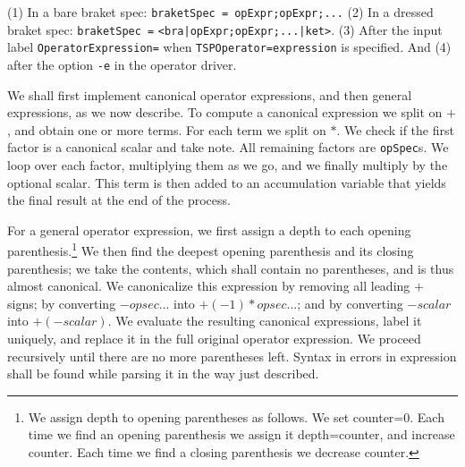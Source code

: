 \documentclass{article}
\begin{document}
(1) In a bare braket spec:
 \texttt{braketSpec = opExpr;opExpr;...}
(2) In a dressed braket spec:
 \texttt{braketSpec =} \texttt{<bra|opExpr;opExpr;...|ket>}.
(3) After the input label \texttt{OperatorExpression=} when
 \texttt{TSPOperator=expression} is specified.
And (4) after the option \verb!-e! in the operator driver.

We shall first implement canonical operator expressions, and then general expressions,
as we now describe.
To compute a canonical expression we split on $+$, and obtain one or more terms.
For each term we split on $*$. We check if the first factor is a 
canonical scalar and take note. All remaining factors are \texttt{opSpec}s.
We loop over each factor, multiplying them as we go, and
we finally multiply by the optional scalar. This term is then added to an
accumulation variable that yields the final result at the end of the process.

For a general operator expression, we first assign a depth to each
opening parenthesis.\footnote{We assign depth to opening parentheses as follows. 
We set counter=0. Each
time we find an opening parenthesis we assign it depth=counter, and increase counter.
Each time we find a closing parenthesis we decrease counter.}
We then find the deepest opening parenthesis and its closing parenthesis;
we take the contents, which shall contain no parentheses, and is thus
almost canonical. We canonicalize this expression by removing all leading $+$ signs;
by converting $-opsec...$ into $+(-1)*opsec...$; and 
by converting $-scalar$ into $+(-scalar)$. We evaluate the resulting
canonical expressions, label it uniquely, and replace it in
the full original operator expression. We proceed recursively until
there are no more parentheses left.
Syntax in errors in expression shall be found while parsing it in the way
just described.
\end{document}
